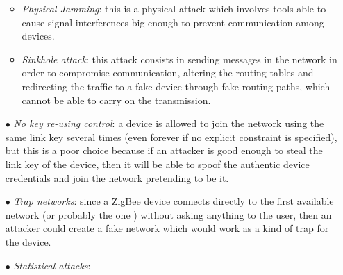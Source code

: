 \documentclass[12pt]{report}
\begin{document}
\begin{itemize}
\begin{itemize}
\item \emph{Physical Jamming}: this is a physical attack which involves tools able to cause signal interferences big enough to prevent communication among devices.\\

\item \emph{Sinkhole attack}: this attack consists in sending messages in the network in order to compromise communication, altering the routing tables and redirecting the traffic to a fake device through fake routing paths, which cannot be able to carry on the transmission.
\end{itemize}

\item[$\bullet$] \emph{No key re-using control}: a device is allowed to join the network using the same link key several times (even forever if no explicit constraint is specified), but this is a poor choice because if an attacker is good enough to steal the link key of the device, then it will be able to spoof the authentic device credentials and join the network pretending to be it.

\item[$\bullet$] \emph{Trap networks}: since a ZigBee device connects directly to the first available network (or probably the one ) without asking anything to the user, then an attacker could create a fake network which would work as a kind of trap for the device.

\item[$\bullet$] \emph{Statistical attacks}: 



\end{itemize}
\end{document}
